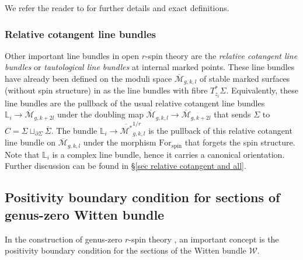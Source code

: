\documentclass[11pt]{amsart}
\theoremstyle{definition}
\theoremstyle{remark}
\newcommand{\<}{\left<}
\renewcommand{\>}{\right>}
\numberwithin{equation}{section}
\def\Mbar{{\overline{\mathcal M}}}
\def\Mbarstar{{\overline{\mathcal M^*}}}
\begin{document}
We refer the reader to \cite[\S 4.1.3]{BCT2} for further details and exact definitions.

\subsubsection{Relative cotangent line bundles}
Other important line bundles in open $r$-spin theory are the \emph{relative cotangent line bundles} or \emph{tautological line bundles} at internal marked points. These line bundles have already been defined on the moduli space $\Mbar_{g,k,l}$ of stable marked surfaces (without spin structure) %
in \cite{PST14} as %
the line bundles with fibre $T^*_{z_i}\Sigma$. Equivalently, these line bundles are the pullback of the usual relative cotangent line bundles ${\mathbb{L}}_i\to\Mbar_{g,k+2l}$ under the doubling map $\Mbar_{g,k,l} \to \Mbar_{g,k+2l}$ that sends $\Sigma$ to $C=\Sigma\sqcup_{\partial\Sigma}\overline{\Sigma}$.  The bundle $\mathbb{L}_i\to\Mbarstar_{g,k,l}^{1/r}$ is the pullback of this relative cotangent line bundle on $\Mbar_{g,k,l}$ under the morphism $\text{For}_{\text{spin}}$ that forgets the spin structure.  Note that $\mathbb{L}_i$ is a complex line bundle, hence it carries a canonical orientation. Further discussion can be found %
in \S \ref{sec relative  cotangent and all}.

\subsection{Positivity boundary condition for sections of genus-zero Witten bundle}\label{sec positivity constraint}

In %
the construction of genus-zero $r$-spin theory \cite{BCT2,TZ2}, an important concept is the positivity boundary condition for the sections of the Witten bundle $\mathcal W$.
\end{document}
